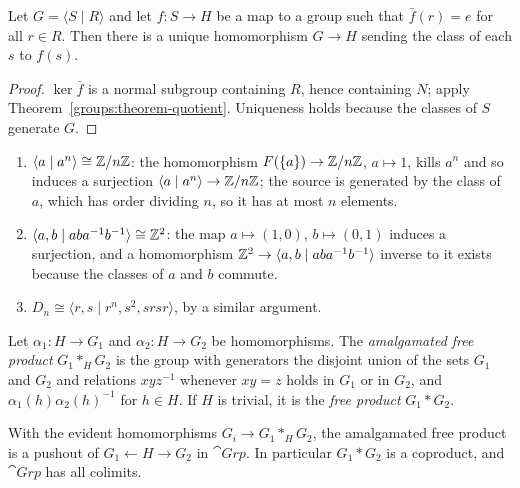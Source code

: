 \begin{proposition}\label{groups:proposition-presentation-property}
Let $G = \langle S \mid R \rangle$ and let $f \colon S \to H$ be a map to a group such that
$\bar f(r) = e$ for all $r \in R$. Then there is a unique homomorphism $G \to H$ sending
the class of each $s$ to $f(s)$.
\end{proposition}

\begin{proof}
$\ker \bar f$ is a normal subgroup containing $R$, hence containing $N$; apply
Theorem~\ref{groups:theorem-quotient}. Uniqueness holds because the classes of $S$
generate $G$.
\end{proof}

\begin{example}\label{groups:example-presentations}
\begin{enumerate}
\item $\langle a \mid a^n \rangle \cong \mathbb{Z}/n\mathbb{Z}$: the homomorphism $F(\{a\}) \to \mathbb{Z}/n\mathbb{Z}$,
$a \mapsto 1$, kills $a^n$ and so induces a surjection $\langle a \mid a^n \rangle \to \mathbb{Z}/n\mathbb{Z}$;
the source is generated by the class of $a$, which has order dividing $n$, so it has
at most $n$ elements.
\item $\langle a, b \mid aba^{-1}b^{-1} \rangle \cong \mathbb{Z}^2$: the map $a \mapsto (1, 0)$,
$b \mapsto (0, 1)$ induces a surjection, and a homomorphism
$\mathbb{Z}^2 \to \langle a, b \mid aba^{-1}b^{-1} \rangle$ inverse to it exists because the classes of $a$
and $b$ commute.
\item $D_n \cong \langle r, s \mid r^n, s^2, srsr \rangle$, by a similar argument.
\end{enumerate}
\end{example}

\begin{definition}\label{groups:definition-amalgam}
Let $\alpha_1 \colon H \to G_1$ and $\alpha_2 \colon H \to G_2$ be homomorphisms. The
\emph{amalgamated free product} $G_1 *_H G_2$ is the group with generators the
disjoint union of the sets $G_1$ and $G_2$ and relations $x y z^{-1}$ whenever $xy = z$
holds in $G_1$ or in $G_2$, and $\alpha_1(h)\alpha_2(h)^{-1}$ for $h \in H$. If $H$ is trivial,
it is the \emph{free product} $G_1 * G_2$.
\end{definition}

\begin{proposition}\label{groups:proposition-amalgam-pushout}
With the evident homomorphisms $G_i \to G_1 *_H G_2$, the amalgamated free product is a
pushout of $G_1 \leftarrow H \rightarrow G_2$ in $\cat{Grp}$. In particular $G_1 * G_2$ is a
coproduct, and $\cat{Grp}$ has all colimits.
\end{proposition}


